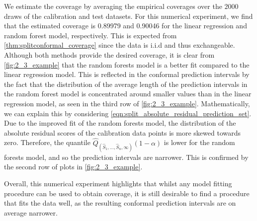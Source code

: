 \documentclass[11pt, titlepage]{article} %
\numberwithin{equation}{section}
\theoremstyle{definition}
\numberwithin{theorem}{section}
\numberwithin{lemma}{section}
\numberwithin{corollary}{section}
\numberwithin{proposition}{section}
\numberwithin{definition}{section}
\numberwithin{remark}{section}
\begin{document}
\noindent
We estimate the coverage by averaging the empirical coverages over the \(2000\) draws of the calibration and test datasets. For this numerical experiment, we find that the estimated coverage is 0.89979 and 0.90046 for the linear regression and random forest model, respectively. This is expected from \cref{thm:splitconformal_coverage} since the data is i.i.d and thus exchangeable. Although both methods provide the desired coverage, it is clear from \cref{fig:2_3_example} that the random forests model is a better fit compared to the linear regression model. This is reflected in the conformal prediction intervals by the fact that the distribution of the average length of the prediction intervals in the random forest model is concentrated around smaller values than in the linear regression model, as seen in the third row of \cref{fig:2_3_example}. Mathematically, we can explain this by considering \eqref{eqn:split_absolute_residual_prediction_set}. Due to the improved fit of the random forests model, the distribution of the absolute residual scores of the calibration data points is more skewed towards zero. Therefore, the quantile \(\hat{Q}_{(\hat{S}_1, \ldots, \hat{S}_n, \infty)}(1-\alpha)\) is lower for the random forests model, and so the prediction intervals are narrower. This is confirmed by the second row of plots in \cref{fig:2_3_example}. \vskip5pt

\noindent
Overall, this numerical experiment highlights that whilst any model fitting procedure can be used to obtain coverage, it is still desirable to find a procedure that fits the data well, as the resulting conformal prediction intervals are on average narrower.
\end{document}
